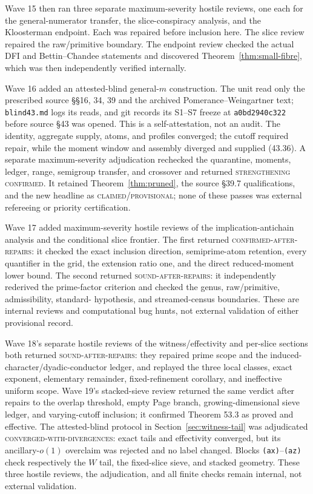 \documentclass[10pt,reqno]{amsart}
\theoremstyle{definition}
\newcommand{\1}{\mathbf 1}
\begin{document}
Wave 15 then ran three separate maximum-severity hostile reviews, one each
for the general-numerator transfer, the slice-conspiracy analysis, and the
Kloosterman endpoint.  Each was repaired before inclusion here.  The slice
review repaired the raw/primitive boundary.  The endpoint review checked the
actual DFI and Bettin--Chandee statements and discovered
Theorem~\ref{thm:small-fibre}, which was then independently verified
internally.

Wave 16 added an attested-blind general-$m$ construction.  The unit read
only the prescribed source \S\S16, 34, 39 and the archived
Pomerance--Weingartner text; \texttt{blind43.md} logs its reads, and git
records its S1--S7 freeze at
\texttt{a0bd2940c322} before source \S43 was
opened.  This is a self-attestation, not an audit.  The identity, aggregate
supply, atoms, and profiles converged; the cutoff required repair, while the
moment window and assembly diverged and supplied (43.36).  A separate
maximum-severity adjudication rechecked the quarantine, moments, ledger,
range, semigroup transfer, and crossover and returned
\textsc{strengthening confirmed}.  It retained
Theorem~\ref{thm:pruned}, the source \S39.7 qualifications, and the new
headline as \textsc{claimed/provisional}; none of these passes was external
refereeing or priority certification.

Wave 17 added maximum-severity hostile reviews of the implication-antichain
analysis and the conditional slice frontier.  The first returned
\textsc{confirmed-after-repairs}: it checked the exact inclusion direction,
semiprime-atom retention, every quantifier in the grid, the extension ratio
one, and the direct reduced-moment lower bound.  The second returned
\textsc{sound-after-repairs}: it independently rederived the prime-factor
criterion and checked the genus, raw/primitive, admissibility, standard-
hypothesis, and streamed-census boundaries.  These are internal reviews and
computational bug hunts, not external validation of either provisional
record.

Wave 18's separate hostile reviews of the witness/effectivity and per-slice
sections both returned \textsc{sound-after-repairs}: they repaired prime
scope and the induced-character/dyadic-conductor ledger, and replayed the
three local classes, exact exponent, elementary remainder, fixed-refinement
corollary, and ineffective uniform scope.  Wave 19's stacked-sieve review
returned the same verdict after repairs to the overlap threshold, empty Page
branch, growing-dimensional sieve ledger, and varying-cutoff inclusion; it
confirmed Theorem 53.3 as proved and effective.  The attested-blind protocol
in Section~\ref{sec:witness-tail} was adjudicated
\textsc{converged-with-divergences}: exact tails and effectivity converged,
but its ancillary-$o(1)$ overclaim was rejected and no label changed.
Blocks \texttt{(ax)}--\texttt{(az)} check respectively the $W$ tail, the
fixed-slice sieve, and stacked geometry.  These three hostile reviews, the
adjudication, and all finite checks remain internal, not external validation.
\end{document}
